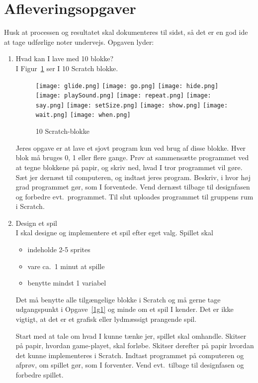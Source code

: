 \documentclass[a4paper,12pt]{article}
\newcounter{exerciseNumber}
\newcommand{\typeLetter}{g}
\begin{document}
\section*{Afleveringsopgaver}
Husk at processen og resultatet skal dokumenteres til sidst, så det er en god ide at tage udførlige noter undervejs. Opgaven lyder:
\begin{enumerate}[label=\theexerciseNumber  \typeLetter.\arabic*,start=0]
\item \label{1g1} Hvad kan I lave med 10 blokke?\\
  I Figur~\ref{fig:blokke} ser I 10 Scratch blokke.
  \begin{figure}
    \centering
    \texttt{[image: glide.png]}
    \texttt{[image: go.png]}
    \texttt{[image: hide.png]}
    \texttt{[image: playSound.png]}
    \texttt{[image: repeat.png]}
    \texttt{[image: say.png]}
    \texttt{[image: setSize.png]}
    \texttt{[image: show.png]}
    \texttt{[image: wait.png]}
    \texttt{[image: when.png]}
    \caption{10 Scratch-blokke}
    \label{fig:blokke}
  \end{figure}
  Jeres opgave er at lave et sjovt program kun ved brug af disse blokke. Hver blok må bruges 0, 1 eller flere gange. Prøv at sammensætte programmet ved at tegne blokkene på papir, og skriv ned, hvad I tror programmet vil gøre. Sæt jer dernæst til computeren, og indtast jeres program. Beskriv, i hvor høj grad programmet gør, som I forventede. Vend dernæst tilbage til designfasen og forbedre evt.\ programmet. Til slut uploades programmet til gruppens rum i Scratch.
\item \label{1g2} Design et spil\\
  I skal designe og implementere et spil efter eget valg. Spillet skal
  \begin{itemize}
  \item indeholde 2-5 sprites 
  \item vare ca.\ 1 minut at spille 
  \item benytte mindst 1 variabel
  \end{itemize}
  Det må benytte alle tilgængelige blokke i Scratch og må gerne tage udgangspunkt i Opgave~\ref{1g1} og minde om et spil I kender. Det er ikke vigtigt, at det er et grafisk eller lydmæssigt prangende spil.

  Start med at tale om hvad I kunne tænke jer, spillet skal omhandle. Skitser på papir, hvordan game-playet, skal forløbe. Skitser derefter på papir hvordan det kunne implementeres i Scratch. Indtast programmet på computeren og afprøv, om spillet gør, som I forventer. Vend evt.\ tilbage til designfasen og forbedre spillet.
\end{enumerate}
\end{document}
